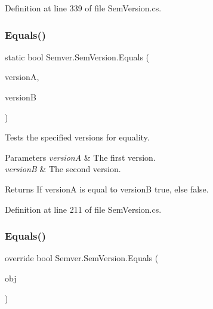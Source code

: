 Definition at line 339 of file Sem\+Version.\+cs.

\mbox{\label{class_semver_1_1_sem_version_a6d469a3a2b0caf2d0edecda486f86464}} 
\subsubsection{\texorpdfstring{Equals()}{Equals()}\hspace{0.1cm}{\footnotesize\ttfamily [1/2]}}
{\footnotesize\ttfamily static bool Semver.\+Sem\+Version.\+Equals (\begin{DoxyParamCaption}\item[{\mbox{\hyperlink{class_semver_1_1_sem_version}{Sem\+Version}}}]{versionA,  }\item[{\mbox{\hyperlink{class_semver_1_1_sem_version}{Sem\+Version}}}]{versionB }\end{DoxyParamCaption})\hspace{0.3cm}{\ttfamily [static]}}



Tests the specified versions for equality. 


\begin{DoxyParams}{Parameters}
{\em versionA} & The first version.\\
\hline
{\em versionB} & The second version.\\
\hline
\end{DoxyParams}
\begin{DoxyReturn}{Returns}
If versionA is equal to versionB {\ttfamily true}, else {\ttfamily false}.
\end{DoxyReturn}


Definition at line 211 of file Sem\+Version.\+cs.

\mbox{\label{class_semver_1_1_sem_version_a32a7224158056561d19ee7b2973f4ce1}} 
\subsubsection{\texorpdfstring{Equals()}{Equals()}\hspace{0.1cm}{\footnotesize\ttfamily [2/2]}}
{\footnotesize\ttfamily override bool Semver.\+Sem\+Version.\+Equals (\begin{DoxyParamCaption}\item[{object}]{obj }\end{DoxyParamCaption})}



